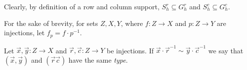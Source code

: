 \documentclass[../paper.tex]{subfiles}
\begin{document}
Clearly, by definition of a row and column support, $S^r_h \subseteq G^r_h$ and
$S^c_h \subseteq G^c_h$.






For the sake of brevity, for sets $Z,X,Y$, where $f : Z \rightarrow X$ and $p :
Z \rightarrow Y$ are injections, let $f_p = f \cdot p^{-1}$.

\begin{definition}
  Let $\vec{x}, \vec{y} : Z \rightarrow X$ and $\vec{r}, \vec{c}: Z \rightarrow
  Y$ be injections. If $\vec{x} \cdot \vec{r}^{-1} \sim \vec{y} \cdot
  \vec{c}^{-1}$ we say that $(\vec{x}, \vec{y})$ and $(\vec{r} \vec{c})$ have
  the same \emph{type}.
\end{definition}
\end{document}
